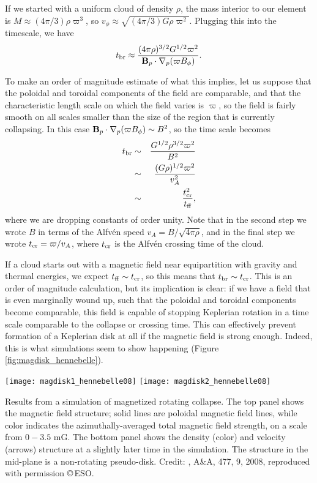 If we started with a uniform cloud of density $\rho$, the mass interior to our element is $M\approx (4\pi/3) \rho \varpi^3$, so $v_\phi \approx \sqrt{(4\pi/3) G \rho \varpi^2}$. Plugging this into the timescale, we have
\begin{equation}
t_{\rm br} \approx \frac{(4\pi \rho)^{3/2} G^{1/2} \varpi^2}{\mathbf{B}_p \cdot\nabla_p (\varpi B_\phi)}.
\end{equation}

To make an order of magnitude estimate of what this implies, let us suppose that the poloidal and toroidal components of the field are comparable, and that the characteristic length scale on which the field varies is $\varpi$, so the field is fairly smooth on all scales smaller than the size of the region that is currently collapsing. In this case $\mathbf{B}_p \cdot \nabla_p (\varpi B_\phi) \sim B^2$, so the time scale becomes
\begin{eqnarray}
t_{\rm br} & \sim & \frac{G^{1/2}\rho^{3/2} \varpi^2}{B^2} \\
& \sim & \frac{(G\rho)^{1/2} \varpi^2}{v_A^2} \\
& \sim & \frac{t_{\rm cr}^2}{t_{\rm ff}},
\end{eqnarray}
where we are dropping constants of order unity. Note that in the second step we wrote $B$ in terms of the Alfv\'en speed $v_A = B/\sqrt{4\pi \rho}$, and in the final step we wrote $t_{\rm cr} = \varpi/v_A$, where $t_{\rm cr}$ is the Alfv\'en crossing time of the cloud.

If a cloud starts out with a magnetic field near equipartition with gravity and thermal energies, we expect $t_{\rm ff} \sim t_{\rm cr}$, so this means that $t_{\rm br}\sim t_{\rm cr}$. This is an order of magnitude calculation, but its implication is clear: if we have a field that is even marginally wound up, such that the poloidal and toroidal components become comparable, this field is capable of stopping Keplerian rotation in a time scale comparable to the collapse or crossing time. This can effectively prevent formation of a Keplerian disk at all if the magnetic field is strong enough. Indeed, this is what simulations seem to show happening (Figure \ref{fig:magdisk_hennebelle}).

\begin{marginfigure}
\texttt{[image: magdisk1\_hennebelle08]}
\texttt{[image: magdisk2\_hennebelle08]}
\caption[Simulations of magnetized rotating collapse]{
\label{fig:magdisk_hennebelle}
Results from a simulation of magnetized rotating collapse. The top panel shows the magnetic field structure; solid lines are poloidal magnetic field lines, while color indicates the azimuthally-averaged total magnetic field strength, on a scale from $0-3.5$ mG. The bottom panel shows the density (color) and velocity (arrows) structure at a slightly later time in the simulation. The structure in the mid-plane is a non-rotating pseudo-disk. Credit:  \citeauthor{hennebelle08c}, A\&A, 477, 9, 2008, reproduced with
permission \copyright\,ESO.
}
\end{marginfigure}

